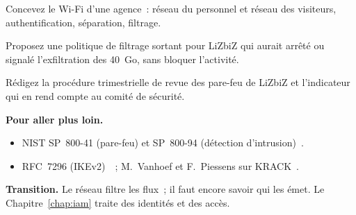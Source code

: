 \begin{boxexo}[title={\ding{45}\quad Exercice~16.8. Le Wi-Fi des visiteurs \niveaumoyen}]
Concevez le Wi-Fi d'une agence~: réseau du personnel et réseau des
visiteurs, authentification, séparation, filtrage.
\end{boxexo}

\begin{boxexo}[title={\ding{45}\quad Exercice~16.9. Le filtrage sortant \niveauexpert}]
Proposez une politique de filtrage sortant pour LiZbiZ qui aurait arrêté
ou signalé l'exfiltration des 40~Go, sans bloquer l'activité.
\end{boxexo}

\begin{boxexo}[title={\ding{45}\quad Exercice~16.10. Un programme de revue \niveauexpert}]
Rédigez la procédure trimestrielle de revue des pare-feu de LiZbiZ et
l'indicateur qui en rend compte au comité de sécurité.
\end{boxexo}

\bigskip

\begin{boxinfo}
\textbf{Pour aller plus loin.}
\begin{itemize}
    \item NIST SP~800-41 (pare-feu) et SP~800-94 (détection
          d'intrusion)~\cite{nist80041,nist80094}.
    \item RFC~7296 (IKEv2)~\cite{rfc7296}~; M.~Vanhoef et F.~Piessens sur
          KRACK~\cite{vanhoef2017}.
\end{itemize}
\end{boxinfo}

\begin{boxinfo}
\textbf{Transition.} Le réseau filtre les flux~; il faut encore savoir qui
les émet. Le Chapitre~\ref{chap:iam} traite des identités et des accès.
\end{boxinfo}
